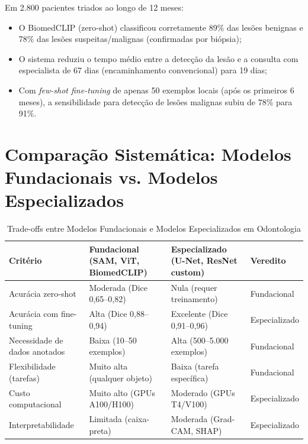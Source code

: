 Em 2.800 pacientes triados ao longo de 12 meses:
\begin{itemize}
    \item O BiomedCLIP (zero-shot) classificou corretamente 89\% das lesões benignas e 78\% das lesões suspeitas/malignas (confirmadas por biópsia);
    \item O sistema reduziu o tempo médio entre a detecção da lesão e a consulta com especialista de 67 dias (encaminhamento convencional) para 19 dias;
    \item Com \textit{few-shot fine-tuning} de apenas 50 exemplos locais (após os primeiros 6 meses), a sensibilidade para detecção de lesões malignas subiu de 78\% para 91\%.
\end{itemize}


\section{Comparação Sistemática: Modelos Fundacionais vs. Modelos Especializados}

\begin{table}[H]
\centering
\caption{Trade-offs entre Modelos Fundacionais e Modelos Especializados em Odontologia}
\label{tab:foundation-vs-specialized}
\begin{tabular}{p{2.5cm}p{2.8cm}p{2.8cm}p{3cm}}
\toprule
\textbf{Critério} & \textbf{Fundacional (SAM, ViT, BiomedCLIP)} & \textbf{Especializado (U-Net, ResNet custom)} & \textbf{Veredito} \\
\midrule
Acurácia zero-shot & Moderada (Dice 0,65--0,82) & Nula (requer treinamento) & Fundacional \\
Acurácia com fine-tuning & Alta (Dice 0,88--0,94) & Excelente (Dice 0,91--0,96) & Especializado \\
Necessidade de dados anotados & Baixa (10--50 exemplos) & Alta (500--5.000 exemplos) & Fundacional \\
Flexibilidade (tarefas) & Muito alta (qualquer objeto) & Baixa (tarefa específica) & Fundacional \\
Custo computacional & Muito alto (GPUs A100/H100) & Moderado (GPUs T4/V100) & Especializado \\
Interpretabilidade & Limitada (caixa-preta) & Moderada (Grad-CAM, SHAP) & Especializado \\
\bottomrule
\end{tabular}
\end{table}

